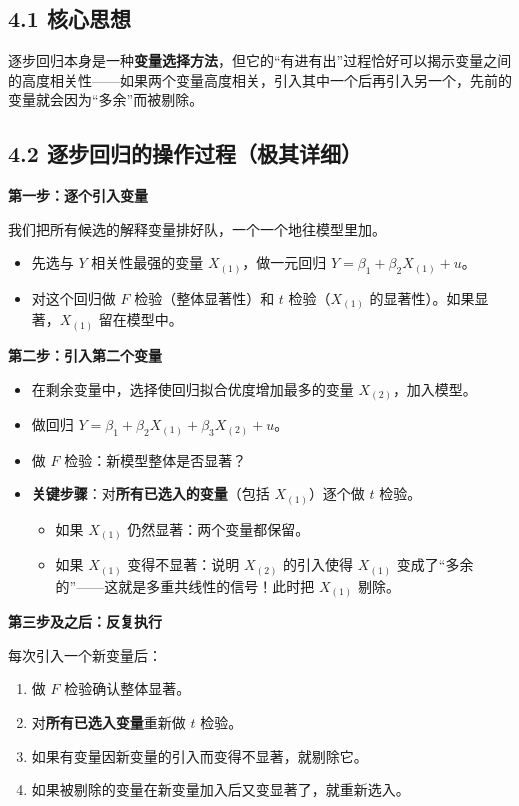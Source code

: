 \documentclass[12pt,a4paper]{ctexart}
\begin{document}
\subsection*{4.1 核心思想}

逐步回归本身是一种\textbf{变量选择方法}，但它的“有进有出”过程恰好可以揭示变量之间的高度相关性——如果两个变量高度相关，引入其中一个后再引入另一个，先前的变量就会因为“多余”而被剔除。

\subsection*{4.2 逐步回归的操作过程（极其详细）}

\textbf{第一步：逐个引入变量}

我们把所有候选的解释变量排好队，一个一个地往模型里加。
\begin{itemize}
  \item 先选与 $Y$ 相关性最强的变量 $X_{(1)}$，做一元回归 $Y = \beta_1 + \beta_2 X_{(1)} + u$。
  \item 对这个回归做 $F$ 检验（整体显著性）和 $t$ 检验（$X_{(1)}$ 的显著性）。如果显著，$X_{(1)}$ 留在模型中。
\end{itemize}

\textbf{第二步：引入第二个变量}
\begin{itemize}
  \item 在剩余变量中，选择使回归拟合优度增加最多的变量 $X_{(2)}$，加入模型。
  \item 做回归 $Y = \beta_1 + \beta_2 X_{(1)} + \beta_3 X_{(2)} + u$。
  \item 做 $F$ 检验：新模型整体是否显著？
  \item \textbf{关键步骤}：对\textbf{所有已选入的变量}（包括 $X_{(1)}$）逐个做 $t$ 检验。
  \begin{itemize}
    \item 如果 $X_{(1)}$ 仍然显著：两个变量都保留。
    \item 如果 $X_{(1)}$ 变得不显著：说明 $X_{(2)}$ 的引入使得 $X_{(1)}$ 变成了“多余的”——这就是多重共线性的信号！此时把 $X_{(1)}$ 剔除。
  \end{itemize}
\end{itemize}

\textbf{第三步及之后：反复执行}

每次引入一个新变量后：
\begin{enumerate}
  \item 做 $F$ 检验确认整体显著。
  \item 对\textbf{所有已选入变量}重新做 $t$ 检验。
  \item 如果有变量因新变量的引入而变得不显著，就剔除它。
  \item 如果被剔除的变量在新变量加入后又变显著了，就重新选入。
\end{enumerate}
\end{document}
